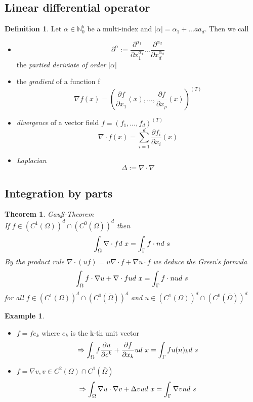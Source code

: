 \documentclass[english]{article}
\newtheorem*{theorem}{Theorem}
\theoremstyle{definition}
\newtheorem*{defi}{Definition}
\newtheorem*{exa}{Example}
\theoremstyle{remark}
\newcommand{\f}[2]{\frac{#1}{#2}}							%
\newcommand{\p}{\partial}
\newcommand{\NN}{\mathbb{N}}			%
\renewcommand{\aa}{\alpha}		%
\newcommand{\OO}{\Omega}
\newcommand{\drw}{\Rightarrow}			%
\newcommand{\tri}{\nabla}
\begin{document}
\subsection{Linear differential operator}
\begin{defi}
  Let $\aa \in \NN_0 ^b$ be a multi-index and $|\aa| = \aa_1+...aa_d$. Then we call 
  \begin{itemize}
  \item $$\p^\aa:=\f{\p^{\aa_1}}{\p x_1^{\aa_1}}...\f{\p^{\aa_d}}{\p x_d^{\aa_d}}$$
    the \emph{partied deriviate of order} $|\aa|$\\
  \item the \emph{gradient} of a function f 
    $$\nabla f (x) = (\f{\p f}{\p x_1}(x),...,\f{\p f}{\p x_p}(x))^{(T)}$$
  \item \emph{divergence} of a vector field $ f=(f_1,...,f_d)^{(T)}$
    $$\nabla \cdot f(x) = \sum_{i=1}^d \f{\p f_i}{\p x_i}(x)$$
  \item \emph{Laplacian}
    $$\Delta :=\tri \cdot \tri$$
  \end{itemize}
\end{defi}
\subsection{Integration by parts}
\begin{theorem} Gau\ss{}-Theorem\\
  If $f \in(C^1(\OO))^d\cap (C^0(\bar\OO))^d$ then 
  $$\int_\OO \tri \cdot f d\ x = \int_\GG f \cdot n d\ s$$
  By the product rule $\tri \cdot (u f )= u \tri \cdot f + \tri u \cdot f$ we deduce the Green's formula
  $$\int_\OO f \cdot \tri u + \tri \cdot f u d\ x = \int_\GG f \cdot n u d\ s$$
  for all $f \in(C^1(\OO))^d\cap (C^0(\bar\OO))^d$ and $u \in(C^1(\OO))^d\cap (C^0(\bar\OO))^d$
\end{theorem}
\begin{exa}
  \begin{itemize}
  \item $f=f e_k$ where $e_k$ is the k-th unit vector
    $$\drw \int_\OO f \f{\p u}{\p c^k}+ \f{\p f}{\p x_k} u d\ x = \int_\GG f u(n)_k d\ s$$
  \item $f = \nabla v, v \in C^2(\OO)\cap C^1(\bar\OO)$
    $$\drw \int_\OO \nabla u \cdot \nabla v + \Delta v u d\ x = \int_\GG \nabla v n d\ s$$
    
  \end{itemize}
\end{exa}
\end{document}
